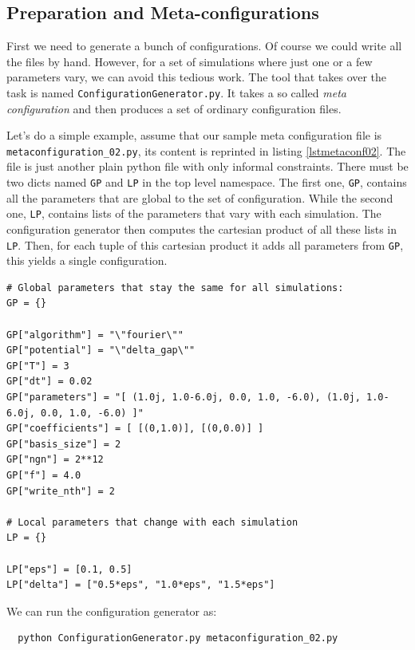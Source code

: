 \documentclass[a4paper,10pt]{report}
\begin{document}
\subsection{Preparation and Meta-configurations}

First we need to generate a bunch of configurations. Of course we could write all
the files by hand. However, for a set of simulations where just one or a few
parameters vary, we can avoid this tedious work. The tool that takes over the
task is named \texttt{ConfigurationGenerator.py}. It takes a so called \emph{meta configuration}
and then produces a set of ordinary configuration files.

Let's do a simple example, assume that our sample meta configuration file is \texttt{metaconfiguration\_02.py},
its content is reprinted in listing \ref{lstmetaconf02}. The file is just another
plain python file with only informal constraints. There must be two dicts named
\texttt{GP} and \texttt{LP} in the top level namespace. The first one, \texttt{GP},
contains all the parameters that are global to the set of configuration. While the second
one, \texttt{LP}, contains lists of the parameters that vary with each simulation.
The configuration generator then computes the cartesian product of all these
lists in \texttt{LP}. Then, for each tuple of this cartesian product it adds all
parameters from \texttt{GP}, this yields a single configuration.

\begin{lstlisting}[float=tp,frame=single,label=lstmetaconf02,caption={Sample meta configuration \texttt{metaconfiguration\_02.py}}]
# Global parameters that stay the same for all simulations:
GP = {}

GP["algorithm"] = "\"fourier\""
GP["potential"] = "\"delta_gap\""
GP["T"] = 3
GP["dt"] = 0.02
GP["parameters"] = "[ (1.0j, 1.0-6.0j, 0.0, 1.0, -6.0), (1.0j, 1.0-6.0j, 0.0, 1.0, -6.0) ]"
GP["coefficients"] = [ [(0,1.0)], [(0,0.0)] ]
GP["basis_size"] = 2
GP["ngn"] = 2**12
GP["f"] = 4.0
GP["write_nth"] = 2

# Local parameters that change with each simulation
LP = {}

LP["eps"] = [0.1, 0.5]
LP["delta"] = ["0.5*eps", "1.0*eps", "1.5*eps"]
\end{lstlisting}

We can run the configuration generator as:

\begin{verbatim}
  python ConfigurationGenerator.py metaconfiguration_02.py
\end{verbatim}
\end{document}
